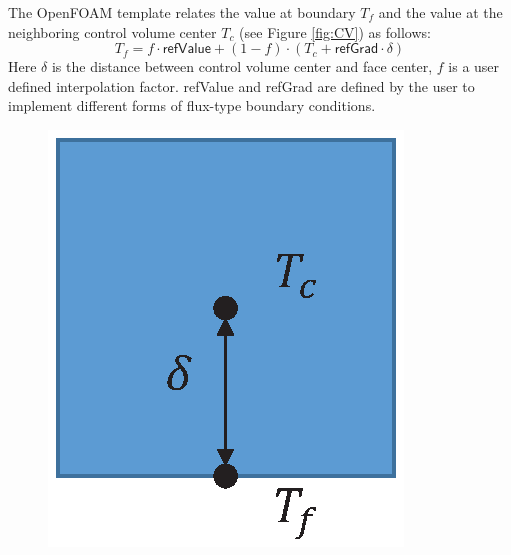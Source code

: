 The OpenFOAM template relates the value at boundary $T_f$ and the value at the neighboring control volume center $T_c$ (see Figure \ref{fig:CV}) as follows:
\begin{equation}
T_f = f\cdot \mathsf{refValue} + (1-f)\cdot(T_c + \mathsf{refGrad}\cdot\delta)
\label{eq:OF_BC}
\end{equation}
Here $\delta$ is the distance between control volume center and face center, $f$ is a user defined interpolation factor. \textsf{refValue} and \textsf{refGrad} are defined by the user to implement different forms of flux-type boundary conditions.

\begin{figure}[h]
\centering
\includegraphics[scale=0.5]{openfoam/CV1.eps}

\end{figure}
